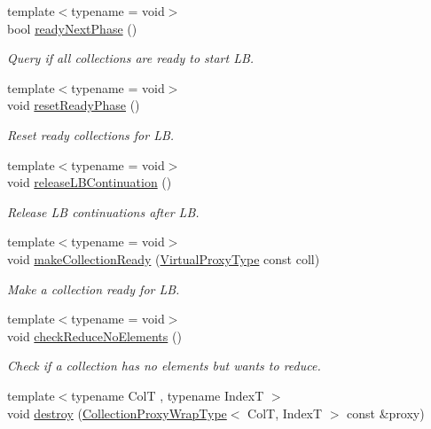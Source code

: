 \begin{DoxyCompactItemize}
{\footnotesize template$<$typename  = void$>$ }\\bool \hyperlink{structvt_1_1vrt_1_1collection_1_1_collection_manager_ae47451b1fb1fd640929995d964e052a6}{ready\+Next\+Phase} ()
\begin{DoxyCompactList}\small\item\em Query if all collections are ready to start LB. \end{DoxyCompactList}\item 
{\footnotesize template$<$typename  = void$>$ }\\void \hyperlink{structvt_1_1vrt_1_1collection_1_1_collection_manager_af93d07828954a649201ef3fe463bf530}{reset\+Ready\+Phase} ()
\begin{DoxyCompactList}\small\item\em Reset ready collections for LB. \end{DoxyCompactList}\item 
{\footnotesize template$<$typename  = void$>$ }\\void \hyperlink{structvt_1_1vrt_1_1collection_1_1_collection_manager_a98b0c3c96cea99ac8d4310c1140f8880}{release\+L\+B\+Continuation} ()
\begin{DoxyCompactList}\small\item\em Release LB continuations after LB. \end{DoxyCompactList}\item 
{\footnotesize template$<$typename  = void$>$ }\\void \hyperlink{structvt_1_1vrt_1_1collection_1_1_collection_manager_adb1aa79d2e81bb571279f4b57ece0e8f}{make\+Collection\+Ready} (\hyperlink{namespacevt_a1b417dd5d684f045bb58a0ede70045ac}{Virtual\+Proxy\+Type} const coll)
\begin{DoxyCompactList}\small\item\em Make a collection ready for LB. \end{DoxyCompactList}\item 
{\footnotesize template$<$typename  = void$>$ }\\void \hyperlink{structvt_1_1vrt_1_1collection_1_1_collection_manager_a62ff67b1dc813664812a20e430a3f09b}{check\+Reduce\+No\+Elements} ()
\begin{DoxyCompactList}\small\item\em Check if a collection has no elements but wants to reduce. \end{DoxyCompactList}\item 
{\footnotesize template$<$typename ColT , typename IndexT $>$ }\\void \hyperlink{structvt_1_1vrt_1_1collection_1_1_collection_manager_ae6e458293d04d8b29697fa0584c84c67}{destroy} (\hyperlink{structvt_1_1vrt_1_1collection_1_1_collection_manager_a56458ed7f9bb22b631b9b3a745f42f94}{Collection\+Proxy\+Wrap\+Type}$<$ ColT, IndexT $>$ const \&proxy)

\end{DoxyCompactItemize}
